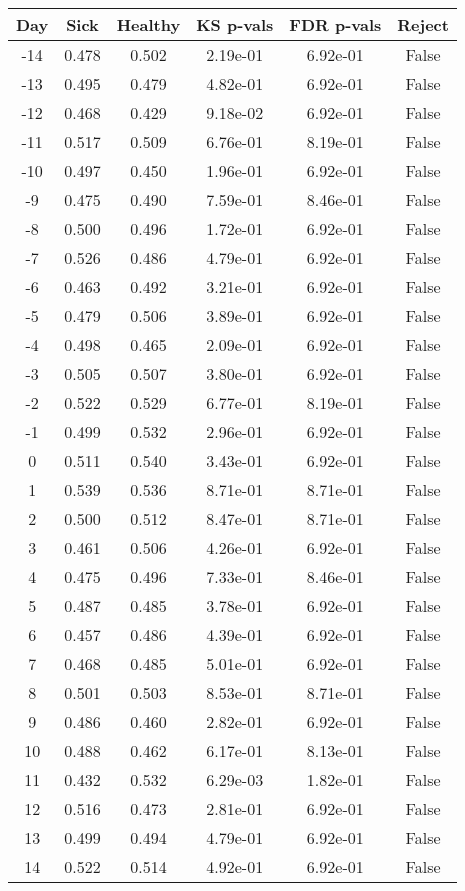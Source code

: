 \begin{tabular}{c|c|c|c|c|c}
Day &  Sick & Healthy &  KS p-vals & FDR p-vals & Reject\\
\hline
-14 & 0.478 &   0.502 &   2.19e-01 &   6.92e-01 &  False\\
-13 & 0.495 &   0.479 &   4.82e-01 &   6.92e-01 &  False\\
-12 & 0.468 &   0.429 &   9.18e-02 &   6.92e-01 &  False\\
-11 & 0.517 &   0.509 &   6.76e-01 &   8.19e-01 &  False\\
-10 & 0.497 &   0.450 &   1.96e-01 &   6.92e-01 &  False\\
 -9 & 0.475 &   0.490 &   7.59e-01 &   8.46e-01 &  False\\
 -8 & 0.500 &   0.496 &   1.72e-01 &   6.92e-01 &  False\\
 -7 & 0.526 &   0.486 &   4.79e-01 &   6.92e-01 &  False\\
 -6 & 0.463 &   0.492 &   3.21e-01 &   6.92e-01 &  False\\
 -5 & 0.479 &   0.506 &   3.89e-01 &   6.92e-01 &  False\\
 -4 & 0.498 &   0.465 &   2.09e-01 &   6.92e-01 &  False\\
 -3 & 0.505 &   0.507 &   3.80e-01 &   6.92e-01 &  False\\
 -2 & 0.522 &   0.529 &   6.77e-01 &   8.19e-01 &  False\\
 -1 & 0.499 &   0.532 &   2.96e-01 &   6.92e-01 &  False\\
  0 & 0.511 &   0.540 &   3.43e-01 &   6.92e-01 &  False\\
  1 & 0.539 &   0.536 &   8.71e-01 &   8.71e-01 &  False\\
  2 & 0.500 &   0.512 &   8.47e-01 &   8.71e-01 &  False\\
  3 & 0.461 &   0.506 &   4.26e-01 &   6.92e-01 &  False\\
  4 & 0.475 &   0.496 &   7.33e-01 &   8.46e-01 &  False\\
  5 & 0.487 &   0.485 &   3.78e-01 &   6.92e-01 &  False\\
  6 & 0.457 &   0.486 &   4.39e-01 &   6.92e-01 &  False\\
  7 & 0.468 &   0.485 &   5.01e-01 &   6.92e-01 &  False\\
  8 & 0.501 &   0.503 &   8.53e-01 &   8.71e-01 &  False\\
  9 & 0.486 &   0.460 &   2.82e-01 &   6.92e-01 &  False\\
 10 & 0.488 &   0.462 &   6.17e-01 &   8.13e-01 &  False\\
 11 & 0.432 &   0.532 &   6.29e-03 &   1.82e-01 &  False\\
 12 & 0.516 &   0.473 &   2.81e-01 &   6.92e-01 &  False\\
 13 & 0.499 &   0.494 &   4.79e-01 &   6.92e-01 &  False\\
 14 & 0.522 &   0.514 &   4.92e-01 &   6.92e-01 &  False\\
\end{tabular}